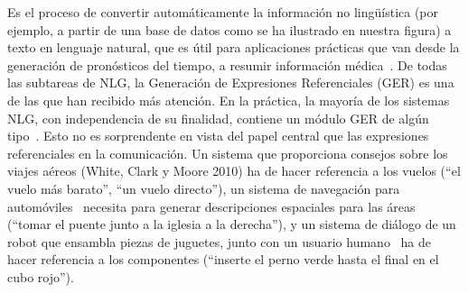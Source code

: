 Es el proceso de convertir autom\'aticamente la informaci\'on no ling\"u\'{i}stica (por ejemplo, a partir de una base de datos como se ha ilustrado en nuestra figura) a texto en lenguaje natural, que es \'util para aplicaciones pr\'acticas que van desde la generaci\'on de pron\'osticos del tiempo, a resumir informaci\'on m\'edica~\cite{dale2000}. De todas las subtareas de NLG, la Generaci\'on de Expresiones Referenciales (GER) es
una de las que han recibido m\'as atenci\'on. En la pr\'actica, la mayor\'ia de los
sistemas NLG, con independencia de su finalidad,
contiene un m\'odulo GER de alg\'un tipo~\cite{Mellish2004}. Esto no es sorprendente
en vista del papel central que las expresiones referenciales en la comunicaci\'on. Un sistema que proporciona
consejos sobre los viajes a\'ereos (White, Clark y Moore 2010) ha de hacer referencia a los vuelos (``el
vuelo m\'as barato'', ``un vuelo directo''), un sistema de navegaci\'on para autom\'oviles~\cite{Drager:2012:GLN:2380816.2380908}
necesita para generar descripciones espaciales para las \'areas (``tomar el puente junto a la iglesia a la derecha''),
y un sistema de di\'alogo de un robot que ensambla piezas de juguetes, junto con un usuario humano~\cite{foster-etal-ijcai2009} ha de hacer referencia a los componentes (``inserte el perno verde hasta el final en el cubo rojo'').\\




